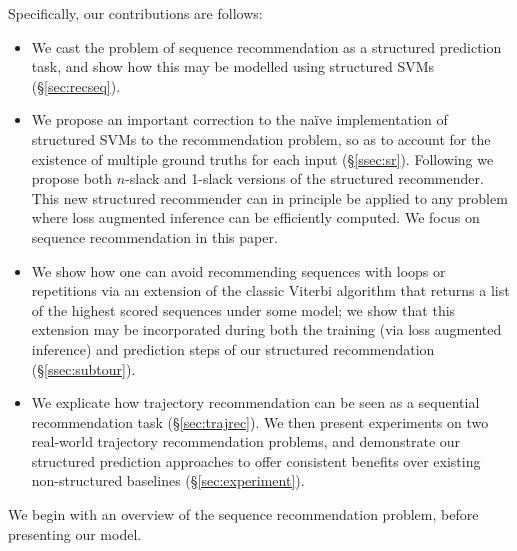 Specifically, our contributions are follows:
\begin{itemize}
	\item We cast the problem of sequence recommendation as a structured prediction task, and show how this may be modelled using structured SVMs (\S\ref{sec:recseq}).

	\item We propose an important correction to the na\"{i}ve implementation of structured SVMs to the recommendation problem, so as to account for the existence of multiple ground truths for each input (\S\ref{ssec:sr}). Following \citet{joachims2009cutting} we propose both $n$-slack and 1-slack versions of the structured recommender. This new structured recommender can in principle be applied to any problem where loss augmented inference can be efficiently computed. We focus on sequence recommendation in this paper.

	\item We show how one can avoid recommending sequences with loops or repetitions via an extension of the classic Viterbi algorithm that returns a list of the highest scored sequences under some model; we show that this extension may be incorporated during both the training (via loss augmented inference) and prediction steps of our structured recommendation (\S\ref{ssec:subtour}).

	\item We explicate how trajectory recommendation can be seen as a sequential recommendation task (\S\ref{sec:trajrec}). We then present experiments on two real-world trajectory recommendation problems, and demonstrate our structured prediction approaches to offer consistent benefits over existing non-structured baselines (\S\ref{sec:experiment}).
\end{itemize}

We begin with an overview of the sequence recommendation problem, before presenting our model.
